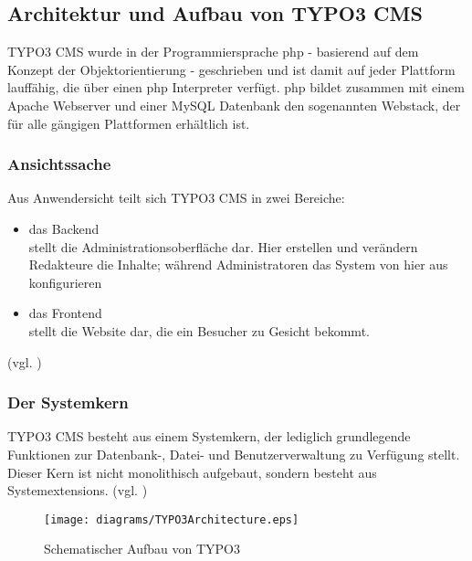 
\subsection{Architektur und Aufbau von TYPO3 CMS}
\label{subsec:architectureTypo3}
TYPO3 CMS wurde in der Programmiersprache \gls{php} - basierend auf dem Konzept der Objektorientierung - geschrieben und ist damit auf jeder Plattform lauffähig, die über einen \gls{php} Interpreter verfügt. \gls{php} bildet zusammen mit einem Apache Webserver und einer MySQL Datenbank den sogenannten Webstack, der für alle gängigen Plattformen erhältlich ist.

\subsubsection{Ansichtssache}
Aus Anwendersicht teilt sich TYPO3 CMS in zwei Bereiche:

\begin{itemize}
	\item das Backend\\
		stellt die Administrationsoberfläche dar. Hier erstellen und verändern Redakteure die Inhalte; während Administratoren das System von hier aus konfigurieren
	\item das Frontend\\
		stellt die Website dar, die ein Besucher zu Gesicht bekommt.
\end{itemize}
(vgl. \cite[S. 5]{book:dulepovTypo32008})

\newpage

\subsubsection{Der Systemkern}
\label{basics:typo3:subsubsec:coreAndApi}
TYPO3 CMS besteht aus einem Systemkern, der lediglich grundlegende Funktionen zur Datenbank-, Datei- und Benutzerverwaltung zu Verfügung stellt. Dieser Kern ist nicht monolithisch aufgebaut, sondern besteht aus Systemextensions. (vgl. \cite[S. 32]{book:laborenzTypo32006})

\begin{figure}[H]
	\centering
	\texttt{[image: diagrams/TYPO3Architecture.eps]}
	\caption{Schematischer Aufbau von TYPO3}
	\label{fig:typo3Architecture}
\end{figure}

